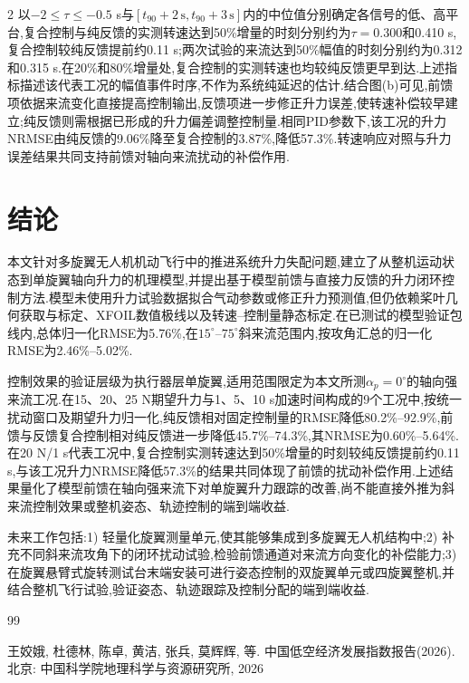 \documentclass{aas}
\begin{document}
\begin{multicols}{2}
以$-2\le\tau\le-0.5$ s与$[t_{90}+2\,\mathrm{s},t_{90}+3\,\mathrm{s}]$内的中位值分别确定各信号的低、高平台,复合控制与纯反馈的实测转速达到50\%增量的时刻分别约为$\tau=0.300$和0.410 s,复合控制较纯反馈提前约0.11 s;两次试验的来流达到50\%幅值的时刻分别约为0.312和0.315 s.在20\%和80\%增量处,复合控制的实测转速也均较纯反馈更早到达.上述指标描述该代表工况的幅值事件时序,不作为系统纯延迟的估计.结合图(b)可见,前馈项依据来流变化直接提高控制输出,反馈项进一步修正升力误差,使转速补偿较早建立;纯反馈则需根据已形成的升力偏差调整控制量.相同PID参数下,该工况的升力NRMSE由纯反馈的9.06\%降至复合控制的3.87\%,降低57.3\%.转速响应对照与升力误差结果共同支持前馈对轴向来流扰动的补偿作用.

\section{结论}

本文针对多旋翼无人机机动飞行中的推进系统升力失配问题,建立了从整机运动状态到单旋翼轴向升力的机理模型,并提出基于模型前馈与直接力反馈的升力闭环控制方法.模型未使用升力试验数据拟合气动参数或修正升力预测值,但仍依赖桨叶几何获取与标定、XFOIL数值极线以及转速--控制量静态标定.在已测试的模型验证包线内,总体归一化RMSE为5.76\%,在$15^{\circ}$--$75^{\circ}$斜来流范围内,按攻角汇总的归一化RMSE为2.46\%--5.02\%.

控制效果的验证层级为执行器层单旋翼,适用范围限定为本文所测$\alpha_p=0^{\circ}$的轴向强来流工况.在15、20、25 N期望升力与1、5、10 s加速时间构成的9个工况中,按统一扰动窗口及期望升力归一化,纯反馈相对固定控制量的RMSE降低80.2\%--92.9\%,前馈与反馈复合控制相对纯反馈进一步降低45.7\%--74.3\%,其NRMSE为0.60\%--5.64\%.在20 N/1 s代表工况中,复合控制实测转速达到50\%增量的时刻较纯反馈提前约0.11 s,与该工况升力NRMSE降低57.3\%的结果共同体现了前馈的扰动补偿作用.上述结果量化了模型前馈在轴向强来流下对单旋翼升力跟踪的改善,尚不能直接外推为斜来流控制效果或整机姿态、轨迹控制的端到端收益.

未来工作包括:1) 轻量化旋翼测量单元,使其能够集成到多旋翼无人机结构中;2) 补充不同斜来流攻角下的闭环扰动试验,检验前馈通道对来流方向变化的补偿能力;3) 在旋翼悬臂式旋转测试台末端安装可进行姿态控制的双旋翼单元或四旋翼整机,并结合整机飞行试验,验证姿态、轨迹跟踪及控制分配的端到端收益.

\begin{thebibliography}{99}
 \addtolength{\itemsep}{0.2em} 

 王姣娥, 杜德林, 陈卓, 黄洁, 张兵, 莫辉辉, 等. 中国低空经济发展指数报告(2026). 北京: 中国科学院地理科学与资源研究所, 2026


\end{thebibliography}
\end{multicols}
\end{document}

